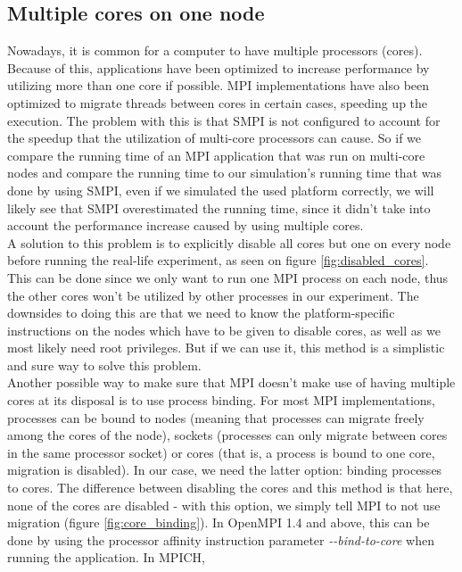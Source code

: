\subsection{Multiple cores on one node}
\label{sec:multiple_cores}
Nowadays, it is common for a computer to have multiple processors
(cores). Because of this, applications have been optimized to increase
performance by utilizing more than one core if possible. MPI
implementations have also been optimized to migrate threads between
cores in certain cases, speeding up the execution. The problem with
this is that SMPI is not configured to account
for the speedup that the utilization of multi-core processors can
cause. So if we compare the running time of an MPI application that
was run on multi-core nodes and compare the running time to our
simulation's running time that was done by using SMPI, even if we
simulated the used platform correctly, we will likely see that SMPI
overestimated the running time, since it didn't take into account the
performance increase caused by using multiple cores.\\[0.3cm]
A solution to this problem is to explicitly disable all cores
but one on every node before running the real-life experiment, as seen
on figure \ref{fig:disabled_cores}.\cite{ms11} This can be done since
we only want to run one MPI process on each node, thus the other cores
won't be utilized by other processes in our experiment. The downsides
to doing this are that we need to know the platform-specific
instructions on the nodes which have to be given to disable cores, as
well as we most likely need root privileges. But if we can use it,
this method is a simplistic and sure way to solve this problem.\\[0.3cm]
Another possible way to make sure that MPI doesn't make use of having
multiple cores at its disposal is to use process binding. For most MPI
implementations, processes can be bound to nodes (meaning that
processes can migrate freely among the cores of the node), sockets
(processes can only migrate between cores in the same processor
socket) or cores (that is, a process is bound to one core, migration
is disabled). In our case, we need the latter option: binding
processes to cores. The difference between disabling the cores and
this method is that here, none of the cores are disabled - with this
option, we simply tell MPI to not use migration (figure
\ref{fig:core_binding}). In OpenMPI 1.4 and above, this can be done by
using the processor affinity instruction parameter
\emph{-{}-bind-to-core} when running the application. In MPICH,
